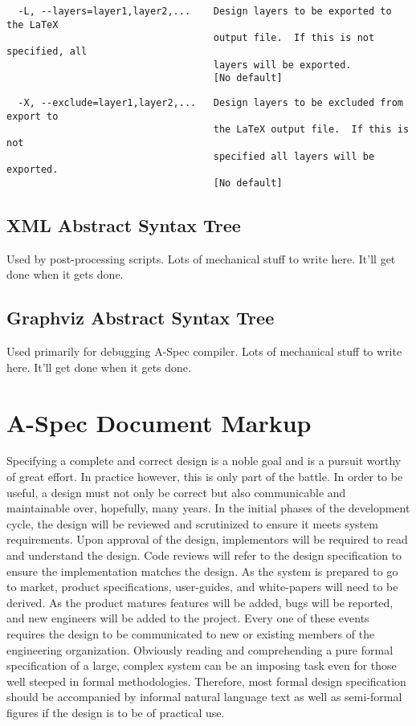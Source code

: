 \documentclass[letterpaper,10pt,draft]{book}
\begin{document}
\begin{verbatim}
  -L, --layers=layer1,layer2,...    Design layers to be exported to the LaTeX
                                    output file.  If this is not specified, all
                                    layers will be exported.
                                    [No default]
\end{verbatim}

\begin{verbatim}
  -X, --exclude=layer1,layer2,...   Design layers to be excluded from export to
                                    the LaTeX output file.  If this is not
                                    specified all layers will be exported.
                                    [No default]
\end{verbatim}

\section{XML Abstract Syntax Tree}
   \label{sect:XML}

Used by post-processing scripts.
Lots of mechanical stuff to write here.
It'll get done when it gets done.

\section{Graphviz Abstract Syntax Tree}
   \label{sect:DOT}

Used primarily for debugging A-Spec compiler.
Lots of mechanical stuff to write here.
It'll get done when it gets done.

\chapter{A-Spec Document Markup}
   \label{ch:Markup}

Specifying a complete and correct design is a noble goal and is a pursuit worthy
of great effort.  In practice however, this is only part of the battle.  In order
to be useful, a design must not only be correct but also communicable and maintainable
over, hopefully, many years.  In the initial phases of the development cycle, the
design will be reviewed and scrutinized to ensure it meets system requirements.
Upon approval of the design, implementors will be required to read and understand
the design.  Code reviews will refer to the design specification to ensure the implementation
matches the design.  As the system is prepared to go to market, product specifications,
user-guides, and white-papers will need to be derived.  As the product matures features
will be added, bugs will be reported, and new engineers will be added to the project.
Every one of these events requires the design to be communicated to new or existing
members of the engineering organization.  Obviously reading and comprehending a pure
formal specification of a large, complex system can be an imposing task even for
those well steeped in formal methodologies.  Therefore, most formal design specification
should be accompanied by informal natural language text as well as semi-formal figures
if the design is to be of practical use.
\end{document}
